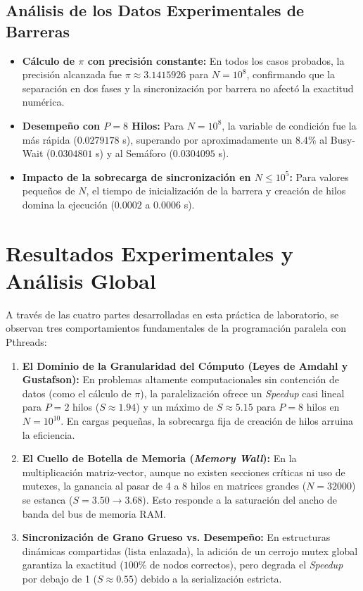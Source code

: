 \documentclass[11pt,a4paper]{article}
\begin{document}
\subsection{Análisis de los Datos Experimentales de Barreras}
\begin{itemize}
    \item \textbf{Cálculo de \texorpdfstring{$\pi$}{pi} con precisión constante:} En todos los casos probados, la precisión alcanzada fue $\pi \approx 3.1415926$ para $N = 10^8$, confirmando que la separación en dos fases y la sincronización por barrera no afectó la exactitud numérica.
    \item \textbf{Desempeño con $P=8$ Hilos:} Para $N = 10^8$, la variable de condición fue la más rápida ($0.0279178$ s), superando por aproximadamente un $8.4\%$ al Busy-Wait ($0.0304801$ s) y al Semáforo ($0.0304095$ s).
    \item \textbf{Impacto de la sobrecarga de sincronización en $N \le 10^5$:} Para valores pequeños de $N$, el tiempo de inicialización de la barrera y creación de hilos domina la ejecución ($0.0002$ a $0.0006$ s).
\end{itemize}

\section{Resultados Experimentales y Análisis Global}

A través de las cuatro partes desarrolladas en esta práctica de laboratorio, se observan tres comportamientos fundamentales de la programación paralela con Pthreads:

\begin{enumerate}
    \item \textbf{El Dominio de la Granularidad del Cómputo (Leyes de Amdahl y Gustafson):}
    En problemas altamente computacionales sin contención de datos (como el cálculo de $\pi$), la paralelización ofrece un \textit{Speedup} casi lineal para $P=2$ hilos ($S \approx 1.94$) y un máximo de $S \approx 5.15$ para $P=8$ hilos en $N=10^{10}$. En cargas pequeñas, la sobrecarga fija de creación de hilos arruina la eficiencia.

    \item \textbf{El Cuello de Botella de Memoria (\textit{Memory Wall}):}
    En la multiplicación matriz-vector, aunque no existen secciones críticas ni uso de mutexes, la ganancia al pasar de 4 a 8 hilos en matrices grandes ($N = 32000$) se estanca ($S = 3.50 \to 3.68$). Esto responde a la saturación del ancho de banda del bus de memoria RAM.

    \item \textbf{Sincronización de Grano Grueso vs. Desempeño:}
    En estructuras dinámicas compartidas (lista enlazada), la adición de un cerrojo mutex global garantiza la exactitud ($100\%$ de nodos correctos), pero degrada el \textit{Speedup} por debajo de 1 ($S \approx 0.55$) debido a la serialización estricta.
\end{enumerate}
\end{document}
